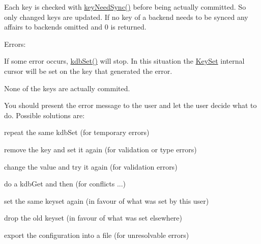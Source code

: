 Each key is checked with \hyperlink{group__keytest_gaf247df0de7aca04b32ef80e39ef12950}{key\-Need\-Sync()} before being actually committed. So only changed keys are updated. If no key of a backend needs to be synced any affairs to backends omitted and 0 is returned.

\begin{DoxyParagraph}{Errors\-:}

\end{DoxyParagraph}
If some error occurs, \hyperlink{group__kdb_ga11436b058408f83d303ca5e996832bcf}{kdb\-Set()} will stop. In this situation the \hyperlink{classkdb_1_1KeySet}{Key\-Set} internal cursor will be set on the key that generated the error.

None of the keys are actually commited.

You should present the error message to the user and let the user decide what to do. Possible solutions are\-:
\begin{DoxyItemize}
\item repeat the same kdb\-Set (for temporary errors)
\item remove the key and set it again (for validation or type errors)
\item change the value and try it again (for validation errors)
\item do a kdb\-Get and then (for conflicts ...)
\begin{DoxyItemize}
\item set the same keyset again (in favour of what was set by this user)
\item drop the old keyset (in favour of what was set elsewhere)
\end{DoxyItemize}
\item export the configuration into a file (for unresolvable errors)
\end{DoxyItemize}

